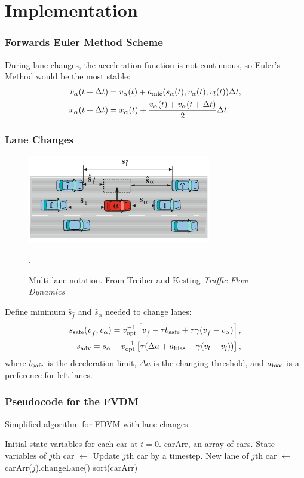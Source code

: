 \documentclass{beamer}
\begin{document}
\section{Implementation}
\begin{frame}
  \frametitle{Forwards Euler Method Scheme}
  During lane changes, the acceleration function is not continuous, so Euler's Method would be the most stable:
  \begin{align*}
    v_\alpha(t+\Delta t) &= v_\alpha(t) +a_{\rm mic}(s_\alpha(t), v_\alpha (t), v_l (t))\Delta t, \\
    x_\alpha(t + \Delta t) &= x_\alpha(t) + \frac{v_\alpha (t) + v_\alpha (t+\Delta t)}{2}\Delta t.
\end{align*}
\end{frame}

\begin{frame}
  \frametitle{Lane Changes}
  \begin{figure}[H]
    \includegraphics[width=8cm]{lane_change_diagram.PNG}
    \centering
    \caption{Multi-lane notation. From Treiber and Kesting \textit{Traffic Flow Dynamics}}.
\end{figure}
  Define minimum $\hat s_{\hat f}$ and $\hat s_{\alpha}$ needed to change lanes: 
  \begin{align*}
    s_{\rm safe} (v_{\hat f}, v_{\alpha}) = v_{\rm opt}^{-1} \left[v_{\hat f} -\tau b_{\rm safe} + \tau \gamma (v_{\hat f} - v_{\alpha}) \right],\\
    s_{\rm adv} = s_{\alpha} + v_{\rm opt}^{-1} \left[\tau(\Delta a + a_{\rm bias} + \gamma(v_l - v_{\hat l}))\right],
  \end{align*}
  where $b_{\rm safe}$ is the  deceleration limit, $\Delta a$ is the changing threshold, and $a_{\rm bias}$ is a preference for left lanes. 
\end{frame}

\begin{frame}
  \frametitle{Pseudocode for the FVDM}
  \begin{algorithm}
    \caption{Simplified algorithm for FDVM with lane changes}\label{alg:car-following-lane}
    \begin{algorithmic}
    \Require Initial state variables for each car at $t=0$. 
    \Require carArr, an array of cars.
      \State State variables of $j$th car $\gets$ Update $j$th car by a timestep.
      \State New lane of $j$th car $\gets$ carArr($j$).changeLane()
      \EndFor
      \State sort(carArr)
    \EndFor
    \end{algorithmic}
    \end{algorithm}
\end{frame}
\end{document}
